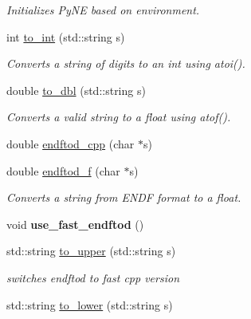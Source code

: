 \begin{DoxyCompactItemize}
\begin{DoxyCompactList}\small\item\em Initializes Py\-N\-E based on environment. \end{DoxyCompactList}\item 
\hypertarget{namespacepyne_ac3037fd5c966b2b515bbbcb0ee56e97a}{int \hyperlink{namespacepyne_ac3037fd5c966b2b515bbbcb0ee56e97a}{to\-\_\-int} (std\-::string s)}\label{namespacepyne_ac3037fd5c966b2b515bbbcb0ee56e97a}

\begin{DoxyCompactList}\small\item\em Converts a string of digits to an int using atoi(). \end{DoxyCompactList}\item 
\hypertarget{namespacepyne_a621b34e474bc505d63aa5c4d7b0ea568}{double \hyperlink{namespacepyne_a621b34e474bc505d63aa5c4d7b0ea568}{to\-\_\-dbl} (std\-::string s)}\label{namespacepyne_a621b34e474bc505d63aa5c4d7b0ea568}

\begin{DoxyCompactList}\small\item\em Converts a valid string to a float using atof(). \end{DoxyCompactList}\item 
double \hyperlink{namespacepyne_a45f290823266c99c35b7b84516087de0}{endftod\-\_\-cpp} (char $\ast$s)
\item 
\hypertarget{namespacepyne_a14e300f1e589b42aaa451bc3cf4c70b8}{double \hyperlink{namespacepyne_a14e300f1e589b42aaa451bc3cf4c70b8}{endftod\-\_\-f} (char $\ast$s)}\label{namespacepyne_a14e300f1e589b42aaa451bc3cf4c70b8}

\begin{DoxyCompactList}\small\item\em Converts a string from E\-N\-D\-F format to a float. \end{DoxyCompactList}\item 
\hypertarget{namespacepyne_a314ad855be2083a69c8c807b137466ac}{void {\bfseries use\-\_\-fast\-\_\-endftod} ()}\label{namespacepyne_a314ad855be2083a69c8c807b137466ac}

\item 
std\-::string \hyperlink{namespacepyne_aa02f7d3ceda305d11379f2f778e4d645}{to\-\_\-upper} (std\-::string s)
\begin{DoxyCompactList}\small\item\em switches endftod to fast cpp version \end{DoxyCompactList}\item 
\hypertarget{namespacepyne_ad694bbfebcefbdb2839ed156ab216abc}{std\-::string \hyperlink{namespacepyne_ad694bbfebcefbdb2839ed156ab216abc}{to\-\_\-lower} (std\-::string s)}\label{namespacepyne_ad694bbfebcefbdb2839ed156ab216abc}


\end{DoxyCompactItemize}
